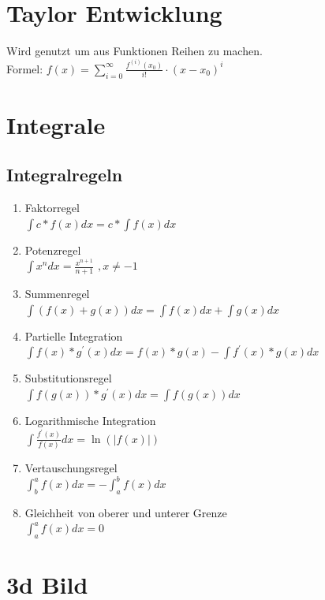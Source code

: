 \documentclass[12pt,a4paper]{article}
\begin{document}
\section{Taylor Entwicklung}
	Wird genutzt um aus Funktionen Reihen zu machen.\\ 
	Formel: $f(x) = \sum_{i = 0}^{\infty} \frac{f^{(i)}(x_0)}{i!} \cdot (x-x_0)^i$

\section{Integrale}

	\subsection{Integralregeln}
		\begin{enumerate}
			\item Faktorregel \\
				$\int {c*f(x)dx} = c * \int {f(x)dx}$
			\item Potenzregel\\
				$\int{x^n}dx = \frac{x^{n+1}}{n+1}$   $, x \ne -1$
			\item Summenregel \\
				$\int {(f(x) + g(x))dx} = \int{f(x)dx} + \int{g(x)dx}$ 
			\item Partielle Integration\\
				$\int{f(x)*g^{'}(x)dx} = f(x)*g(x) - \int{f^{'}(x)*g(x)dx}$
			\item Substitutionsregel \\ 
				$\int{f(g(x)) * g^{'}(x)dx} =\int{f(g(x))dx}$
			\item Logarithmische Integration\\
				$\int{\frac{f^{'}(x)}{f(x)}dx} = \ln{(|f(x)|)} $
			\item Vertauschungsregel \\
				$\int^a_b{f(x)dx} = - \int^b_a{f(x)dx}$
			\item Gleichheit von oberer und unterer Grenze \\
				$\int^a_a{f(x)dx} = 0$
		\end{enumerate}


\section{3d Bild} %
	
\end{document}
